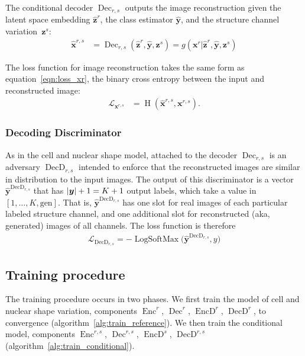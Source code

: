 \documentclass[accepted]{article}
\DeclareMathOperator{\EncD}{EncD}
\DeclareMathOperator{\DecD}{DecD}
\DeclareMathOperator{\Enc}{Enc}
\DeclareMathOperator{\Dec}{Dec}
\DeclareMathOperator{\logsoftmax}{LogSoftMax}
\DeclareMathOperator{\bce}{H}
\DeclarePairedDelimiter\abs{\lvert}{\rvert}
\begin{document}
The conditional decoder $\Dec_{r,s}$ outputs the image reconstruction given the latent space embedding $\hat{\bm{z}}^r$, the class estimator $\hat{\bm{y}}$, and the structure channel variation~$\bm{z}^s$:
%
\begin{align}
    \hat{\bm{x}}^{r,s} &= \Dec_{r,s}({\hat{\bm{z}}^r, \hat{\bm{y}}, \bm{z}^s}) = g(\bm{x}^r | {\hat{\bm{z}}^r, \hat{\bm{y}}, \bm{z}^s})
\end{align}
%

The loss function for image reconstruction takes  the same form as equation~\ref{eqn:loss_xr}, the binary cross entropy between the input and reconstructed image:
%
\begin{align}
    \mathcal{L}_{\bm{x}^{r,s}} &= \bce( \hat{\bm{x}}^{r,s}, \bm{x}^{r,s}).
\end{align}

\subsubsection{Decoding Discriminator}

As in the cell and nuclear shape model, attached to the decoder $\Dec_{r,s}$ is an adversary $\DecD_{r,s}$ intended to enforce that the reconstructed images are similar in distribution to the input images.
The output of this discriminator is a vector $\hat{\bm{y}}^{\DecD_{r,s}}$ that has $\abs{\bm{y}}+1 = K+1$ output labels, which take a value in $[1, \ldots , K, \text{gen}]$.
That is, $\hat{\bm{y}}^{\DecD_{r,s}}$ has one slot for real images of each particular labeled structure channel, and one additional slot for reconstructed (aka, generated) images of all channels.
The loss function is therefore
%
\begin{align}
    \mathcal{L}_{\DecD_{r,s}} = -\logsoftmax \big( \hat{\bm{y}}^{\DecD_{r,s}}, y \big)
\end{align}

\subsection{Training procedure}

The training procedure occurs in two phases.
We first train the model of cell and nuclear shape variation, components $\Enc^r$, $\Dec^r$, $\EncD^r$, $\DecD^r$, to convergence (algorithm~\ref{alg:train_reference}).
We then train the conditional model, components $\Enc^{r,s}$, $\Dec^{r,s}$, $\EncD^s$, $\DecD^{r,s}$ (algorithm~\ref{alg:train_conditional}).
\end{document}
